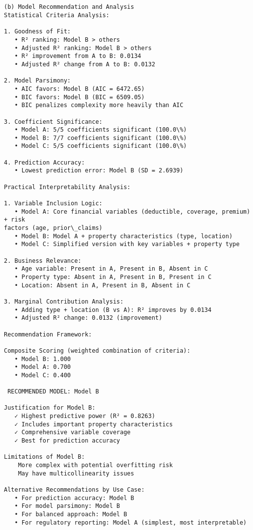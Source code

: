 \documentclass[8pt, twocolumn]{extarticle}
\begin{document}
    \begin{Verbatim}[commandchars=\\\{\}]


(b) Model Recommendation and Analysis
Statistical Criteria Analysis:

1. Goodness of Fit:
   • R² ranking: Model B > others
   • Adjusted R² ranking: Model B > others
   • R² improvement from A to B: 0.0134
   • Adjusted R² change from A to B: 0.0132

2. Model Parsimony:
   • AIC favors: Model B (AIC = 6472.65)
   • BIC favors: Model B (BIC = 6509.05)
   • BIC penalizes complexity more heavily than AIC

3. Coefficient Significance:
   • Model A: 5/5 coefficients significant (100.0\%)
   • Model B: 7/7 coefficients significant (100.0\%)
   • Model C: 5/5 coefficients significant (100.0\%)

4. Prediction Accuracy:
   • Lowest prediction error: Model B (SD = 2.6939)

Practical Interpretability Analysis:

1. Variable Inclusion Logic:
   • Model A: Core financial variables (deductible, coverage, premium) + risk
factors (age, prior\_claims)
   • Model B: Model A + property characteristics (type, location)
   • Model C: Simplified version with key variables + property type

2. Business Relevance:
   • Age variable: Present in A, Present in B, Absent in C
   • Property type: Absent in A, Present in B, Present in C
   • Location: Absent in A, Present in B, Absent in C

3. Marginal Contribution Analysis:
   • Adding type + location (B vs A): R² improves by 0.0134
   • Adjusted R² change: 0.0132 (improvement)

Recommendation Framework:

Composite Scoring (weighted combination of criteria):
   • Model B: 1.000
   • Model A: 0.700
   • Model C: 0.400

 RECOMMENDED MODEL: Model B

Justification for Model B:
   ✓ Highest predictive power (R² = 0.8263)
   ✓ Includes important property characteristics
   ✓ Comprehensive variable coverage
   ✓ Best for prediction accuracy

Limitations of Model B:
    More complex with potential overfitting risk
    May have multicollinearity issues

Alternative Recommendations by Use Case:
   • For prediction accuracy: Model B
   • For model parsimony: Model B
   • For balanced approach: Model B
   • For regulatory reporting: Model A (simplest, most interpretable)
    \end{Verbatim}
\end{document}
